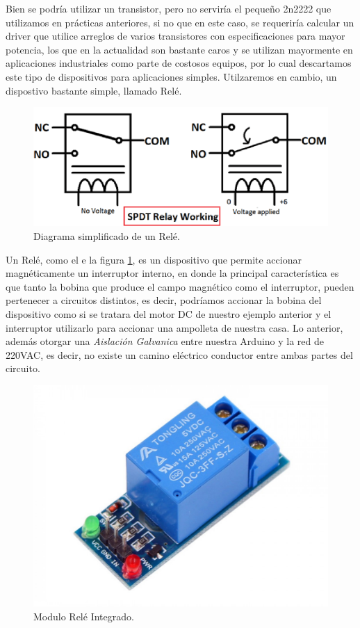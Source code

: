 \documentclass[letterpaper, 10pt]{report}
\begin{document}
Bien se podría utilizar un transistor, pero no serviría el pequeño 2n2222 que utilizamos en prácticas anteriores, si no que en este caso, se requeriría calcular un driver que utilice arreglos de varios transistores con especificaciones para mayor potencia, los que en la actualidad son bastante caros y se utilizan mayormente en aplicaciones industriales como parte de costosos equipos, por lo cual descartamos este tipo de dispositivos para aplicaciones simples. Utilzaremos en cambio, un dispostivo bastante simple, llamado Relé.

\begin{figure}[h]
\centering
\includegraphics[scale=0.5]{relayDiag.png}
\caption{Diagrama simplificado de un Relé. \label{rele}}
\end{figure}

Un Relé, como el e la figura \ref{rele}, es un dispositivo que permite accionar magnéticamente un interruptor interno, en donde la principal característica es que tanto la bobina que produce el campo magnético como el interruptor, pueden pertenecer a circuitos distintos, es decir, podríamos accionar la bobina del dispositivo como si se tratara del motor DC de nuestro ejemplo anterior y el interruptor utilizarlo para accionar una ampolleta de nuestra casa. Lo anterior, además otorgar una \emph{Aislación Galvanica} entre nuestra Arduino y la red de 220VAC, es decir, no existe un camino eléctrico conductor entre ambas partes del circuito.

\begin{figure}[h]
\centering
\includegraphics[scale=0.15]{relayModule.JPG}
\caption{Modulo Relé Integrado. \label{moduloRele}}
\end{figure}
\end{document}
